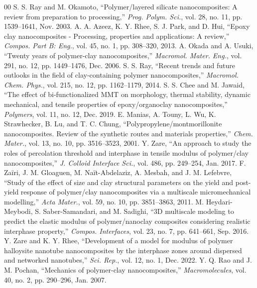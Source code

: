 \documentclass[conference]{IEEEtran}
\begin{document}
\begin{thebibliography}{00}
 S. S. Ray and M. Okamoto, ``Polymer/layered silicate nanocomposites: A review from preparation to processing,'' \textit{Prog. Polym. Sci.}, vol. 28, no. 11, pp. 1539--1641, Nov. 2003.
 A. A. Azeez, K. Y. Rhee, S. J. Park, and D. Hui, ``Epoxy clay nanocomposites - Processing, properties and applications: A review,'' \textit{Compos. Part B: Eng.}, vol. 45, no. 1, pp. 308--320, 2013.
 A. Okada and A. Usuki, ``Twenty years of polymer-clay nanocomposites,'' \textit{Macromol. Mater. Eng.}, vol. 291, no. 12, pp. 1449--1476, Dec. 2006.
 S. S. Ray, ``Recent trends and future outlooks in the field of clay-containing polymer nanocomposites,'' \textit{Macromol. Chem. Phys.}, vol. 215, no. 12, pp. 1162--1179, 2014.
 S. S. Chee and M. Jawaid, ``The effect of bi-functionalized MMT on morphology, thermal stability, dynamic mechanical, and tensile properties of epoxy/organoclay nanocomposites,'' \textit{Polymers}, vol. 11, no. 12, Dec. 2019.
 E. Manias, A. Touny, L. Wu, K. Strawhecker, B. Lu, and T. C. Chung, ``Polypropylene/montmorillonite nanocomposites. Review of the synthetic routes and materials properties,'' \textit{Chem. Mater.}, vol. 13, no. 10, pp. 3516--3523, 2001.
 Y. Zare, ``An approach to study the roles of percolation threshold and interphase in tensile modulus of polymer/clay nanocomposites,'' \textit{J. Colloid Interface Sci.}, vol. 486, pp. 249--254, Jan. 2017.
 F. Za\"{i}ri, J. M. Gloaguen, M. Na\"{i}t-Abdelaziz, A. Mesbah, and J. M. Lefebvre, ``Study of the effect of size and clay structural parameters on the yield and post-yield response of polymer/clay nanocomposites via a multiscale micromechanical modelling,'' \textit{Acta Mater.}, vol. 59, no. 10, pp. 3851--3863, 2011.
 M. Heydari-Meybodi, S. Saber-Samandari, and M. Sadighi, ``3D multiscale modeling to predict the elastic modulus of polymer/nanoclay composites considering realistic interphase property,'' \textit{Compos. Interfaces}, vol. 23, no. 7, pp. 641--661, Sep. 2016.
 Y. Zare and K. Y. Rhee, ``Development of a model for modulus of polymer halloysite nanotube nanocomposites by the interphase zones around dispersed and networked nanotubes,'' \textit{Sci. Rep.}, vol. 12, no. 1, Dec. 2022.
 Y. Q. Rao and J. M. Pochan, ``Mechanics of polymer-clay nanocomposites,'' \textit{Macromolecules}, vol. 40, no. 2, pp. 290--296, Jan. 2007.

\end{thebibliography}
\end{document}
